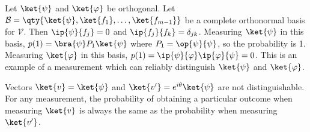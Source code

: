 Let $\ket{\psi}$ and $\ket{\varphi}$ be orthogonal.
Let $\mathcal B = \qty{\ket{\psi}, \ket{f_1}, \dots, \ket{f_{m-1}}}$ be a complete orthonormal basis for $\mathcal V$.
Then $\ip{\psi}{f_j} = 0$ and $\ip{f_j}{f_k} = \delta_{jk}$.
Measuring $\ket{\psi}$ in this basis, $p(1) = \bra{\psi} P_1 \ket{\psi}$ where $P_1 = \op{\psi}{\psi}$, so the probability is 1.
Measuring $\ket{\varphi}$ in this basis, $p(1) = \ip{\psi}{\varphi} \ip{\varphi}{\psi} = 0$.
This is an example of a measurement which can reliably distinguish $\ket{\psi}$ and $\ket{\varphi}$.

Vectors $\ket{v} = \ket{\psi}$ and $\ket{v'} = e^{i\theta} \ket{\psi}$ are not distinguishable.
For any measurement, the probability of obtaining a particular outcome when measuring $\ket{v}$ is always the same as the probability when measuring $\ket{v'}$.
